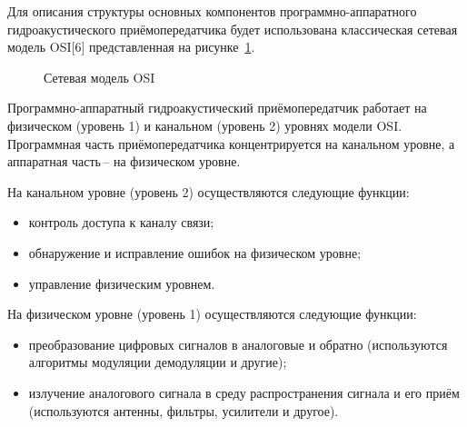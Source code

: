 \documentclass[
    numbers=section,
    document-code={ВКРБ--09.03.04--10.19--XX--26--81}
]{../latex/fqw}
\begin{document}
    Для описания структуры основных компонентов программно-аппаратного гидроакустического приёмопередатчика
    будет использована классическая сетевая модель OSI{[}6{]} представленная на рисунке~\ref{fig:osi_model}.
    \begin{figure}[H]
        \centering
        \caption{Сетевая модель OSI}
        \label{fig:osi_model}
    \end{figure}

    Программно-аппаратный гидроакустический приёмопередатчик работает на
    физическом (уровень 1) и канальном (уровень 2) уровнях модели OSI.
    Программная часть приёмопередатчика концентрируется на канальном уровне,
    а аппаратная часть\,-- на физическом уровне.

    На канальном уровне (уровень 2) осуществляются следующие функции:
    \begin{itemize}
        \item контроль доступа к каналу связи;
        \item обнаружение и исправление ошибок на физическом уровне;
        \item управление физическим уровнем.
    \end{itemize}

    На физическом уровне (уровень 1) осуществляются следующие функции:
    \begin{itemize}
        \item
        преобразование цифровых сигналов в аналоговые и обратно
        (используются алгоритмы модуляции демодуляции и другие);
        \item
        излучение аналогового сигнала в среду распространения сигнала и его приём
        (используются антенны, фильтры, усилители и другое).
    \end{itemize}
\end{document}
